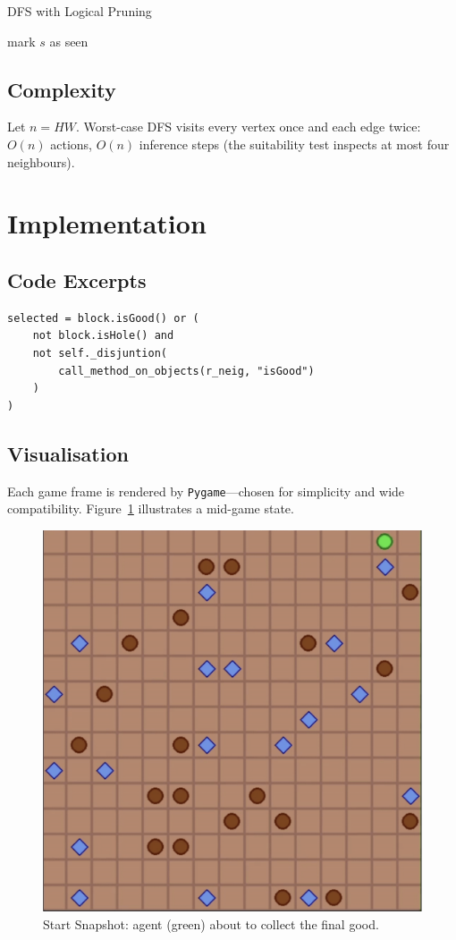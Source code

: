 \documentclass[12pt]{article}
\begin{document}
\begin{algorithm}[ht]
\caption{DFS with Logical Pruning}\label{alg:dfs}
\begin{algorithmic}[1]
    \State mark $s$ as seen
            \State {}
             \Return
            \EndIf
            \State {}
            \State {}
        \EndIf
    \EndFor
\EndProcedure
\end{algorithmic}
\end{algorithm}

\subsection{Complexity}
Let $n{=}HW$.  
Worst-case DFS visits every vertex once and each edge twice:
\(O(n)\) actions, \(O(n)\) inference steps
(the suitability test inspects at most four neighbours).

\section{Implementation}\label{sec:implementation}


\subsection{Code Excerpts}
\begin{lstlisting}[caption={Suitability rule in \texttt{agent.py}},label=lst:code]
selected = block.isGood() or (
    not block.isHole() and
    not self._disjuntion(
        call_method_on_objects(r_neig, "isGood")
    )
)
\end{lstlisting}

\subsection{Visualisation}
Each game frame is rendered by \texttt{Pygame}—chosen for simplicity and wide
compatibility.  Figure~\ref{fig:snapshot} illustrates a mid-game state.

\begin{figure}[ht]
    \centering
    \includegraphics[width=.55\linewidth]{start.png}
    \caption{Start Snapshot: agent (green) about to collect the final good.}
    \label{fig:snapshot}
\end{figure}
\end{document}
